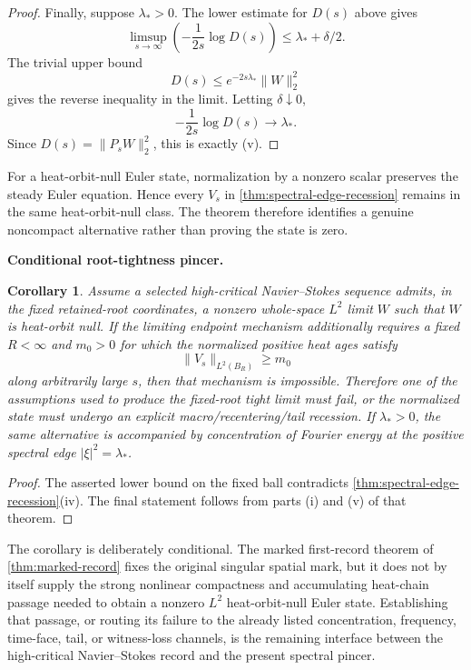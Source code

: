 \documentclass[11pt]{article}
\newtheorem{corollary}[theorem]{Corollary}
\theoremstyle{definition}\newtheorem{problem}[theorem]{Problem}
\theoremstyle{definition}
\theoremstyle{remark}
\begin{document}
\begin{proof}
Finally, suppose \(\lambda_*>0\).  The lower estimate for \(D(s)\) above gives
\[
 \limsup_{s\to\infty}
 \left(-\frac1{2s}\log D(s)\right)
 \le\lambda_*+\delta/2.
\]
The trivial upper bound
\[
 D(s)\le e^{-2s\lambda_*}\|W\|_2^2
\]
gives the reverse inequality in the limit.  Letting \(\delta\downarrow0\),
\[
 -\frac1{2s}\log D(s)\longrightarrow\lambda_*.
\]
Since \(D(s)=\|P_sW\|_2^2\), this is exactly (v).
\end{proof}

For a heat-orbit-null Euler state, normalization by a nonzero scalar preserves
the steady Euler equation.  Hence every \(V_s\) in
\cref{thm:spectral-edge-recession} remains in the same heat-orbit-null class.
The theorem therefore identifies a genuine noncompact alternative rather than
proving the state is zero.

\medskip
\noindent\textbf{Conditional root-tightness pincer.}
\begin{corollary}\label{cor:root-tightness-pincer}
Assume a selected high-critical Navier--Stokes sequence admits, in the fixed
retained-root coordinates, a nonzero whole-space \(L^2\) limit \(W\) such that
\(W\) is heat-orbit null.  If the limiting endpoint mechanism additionally
requires a fixed \(R<\infty\) and \(m_0>0\) for which the normalized positive
heat ages satisfy
\[
 \|V_s\|_{L^2(B_R)}\ge m_0
\]
along arbitrarily large \(s\), then that mechanism is impossible.  Therefore
one of the assumptions used to produce the fixed-root tight limit must fail,
or the normalized state must undergo an explicit macro/recentering/tail
recession.  If \(\lambda_*>0\), the same alternative is accompanied by
concentration of Fourier energy at the positive spectral edge
\(|\xi|^2=\lambda_*\).
\end{corollary}

\begin{proof}
The asserted lower bound on the fixed ball contradicts
\cref{thm:spectral-edge-recession}(iv).  The final statement follows from
parts (i) and (v) of that theorem.
\end{proof}

The corollary is deliberately conditional.  The marked first-record theorem
of \cref{thm:marked-record} fixes the original singular spatial mark, but it
does not by itself supply the strong nonlinear compactness and accumulating
heat-chain passage needed to obtain a nonzero \(L^2\) heat-orbit-null Euler
state.  Establishing that passage, or routing its failure to the already
listed concentration, frequency, time-face, tail, or witness-loss channels,
is the remaining interface between the high-critical Navier--Stokes record
and the present spectral pincer.
\end{document}
